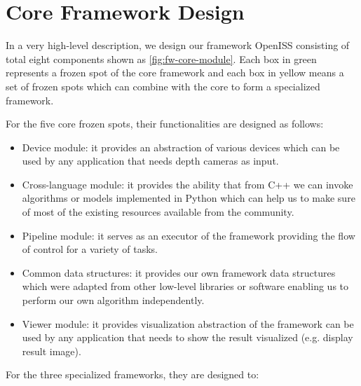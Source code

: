 \section{Core Framework Design}
\label{sec:fw-design-core}

In a very high-level description, we design our framework OpenISS consisting of
total eight components shown as \autoref{fig:fw-core-module}. Each box in
green represents a frozen spot of the core framework and each box in yellow
means a set of frozen spots which can combine with the core to form a
specialized framework.

For the five core frozen spots, their functionalities are designed as follows:

\begin{itemize}
    \item Device module: it provides an abstraction of various devices which
    can be used by any application that needs depth cameras as input.

    \item Cross-language module: it provides the ability that from C++ we can
    invoke algorithms or models implemented in Python which can help us to make
    sure of most of the existing resources available from the community.

    \item Pipeline module: it serves as an executor of the framework providing
    the flow of control for a variety of tasks.

    \item Common data structures: it provides our own framework data structures
    which were adapted from other low-level libraries or software enabling us
    to perform our own algorithm independently.

    \item Viewer module: it provides visualization abstraction of the framework
    can be used by any application that needs to show the result visualized
    (e.g. display result image).
\end{itemize}

For the three specialized frameworks, they are designed to:

